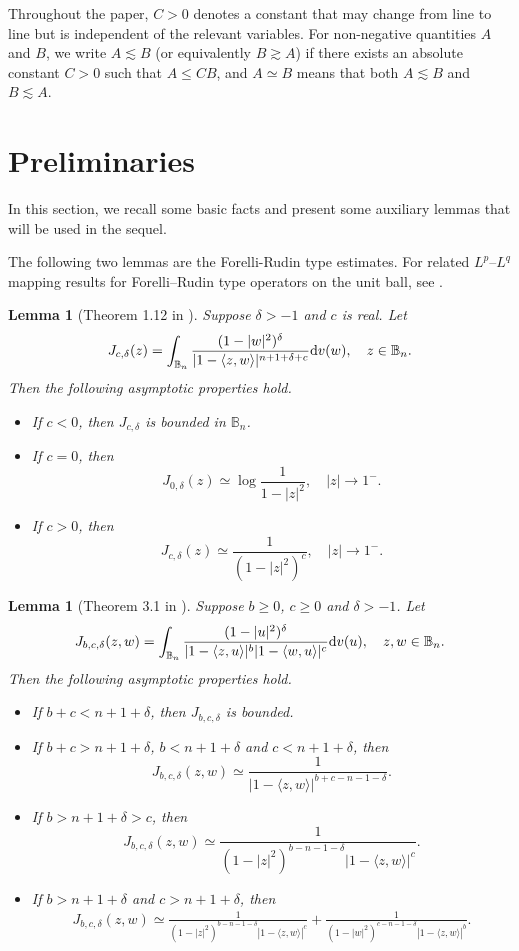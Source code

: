 \documentclass[preprint,12pt,times]{elsarticle}
\newtheorem{lemma}[theorem]{Lemma}
\theoremstyle{definition}
\theoremstyle{remark}
\numberwithin{equation}{section}
\begin{document}
Throughout the paper, $C>0$ denotes a constant that may change from line
to line but is independent of the relevant variables. For non-negative quantities $A$ and $B$, we write $A\lesssim B$ (or equivalently $B\gtrsim A$) if there exists an absolute constant $C>0$ such that $A\leq CB$, and $A\simeq B$ means that both $A\lesssim B$ and $B\lesssim A$. 

\section{Preliminaries}

In this section, we recall some basic facts and present some auxiliary lemmas that will be used in the sequel.

The following two lemmas are the Forelli-Rudin type estimates. For related
$L^p$--$L^q$ mapping results for Forelli--Rudin type operators on the unit
ball, see \cite{ZhaoZhou2022}.

\begin{lemma}[Theorem 1.12 in \cite{Zhu2005}]\label{lemma2.1}
Suppose $\delta>-1$ and $c$ is real. Let
\[
    J_{c,\delta}(z)=\int_{\mathbb{B}_n}\frac{(1-|w|^2)^{\delta}}{|1-\langle z,w\rangle|^{n+1+\delta+c}}{\rm d}v(w),\quad z\in\mathbb{B}_n.
\]
Then the following asymptotic properties hold.
\begin{itemize}
\item[(1)] If $c<0$, then $J_{c,\delta}$ is bounded in $\mathbb{B}_n$.
\item[(2)] If $c=0$, then
\[
    J_{0,\delta}(z)\simeq \log\frac{1}{1-|z|^2},\quad |z|\to 1^-.
\]
\item[(3)] If $c>0$, then
\[
    J_{c,\delta}(z)\simeq \frac{1}{(1-|z|^2)^c},\quad |z|\to 1^{-}.
\]
\end{itemize}
\end{lemma}

\begin{lemma}[Theorem 3.1 in \cite{ZhangLiShangGuo2018}]\label{lemma2.2}
Suppose $b\geq 0$, $c\geq 0$ and $\delta>-1$. Let 
\[
    J_{b,c,\delta}(z,w)=\int_{\mathbb{B}_n}\frac{(1-|u|^2)^{\delta}}{|1-\langle z,u\rangle|^{b}|1-\langle w,u\rangle|^c}{\rm d}v(u),\quad z,w\in\mathbb{B}_n.
\]
Then the following asymptotic properties hold.
\begin{itemize}
\item[(1)] If $b+c<n+1+\delta$, then $J_{b,c,\delta}$ is bounded.
\item[(2)] If $b+c>n+1+\delta$, $b<n+1+\delta$ and $c<n+1+\delta$, then 
\[
    J_{b,c,\delta}(z,w)\simeq \frac{1}{|1-\langle z,w\rangle|^{b+c-n-1-\delta}}.
\]
\item[(3)] If $b>n+1+\delta>c$, then 
\[
    J_{b,c,\delta}(z,w)\simeq \frac{1}{(1-|z|^2)^{b-n-1-\delta}|1-\langle z,w\rangle|^c}.
\]
\item[(4)] If $b>n+1+\delta$ and $c>n+1+\delta$, then
\begin{align*}
J_{b,c,\delta}(z,w)\simeq \frac{1}{(1-|z|^2)^{b-n-1-\delta}|1-\langle z,w\rangle|^c}+\frac{1}{(1-|w|^2)^{c-n-1-\delta}|1-\langle z,w\rangle|^{b}}.
\end{align*}
\end{itemize}
\end{lemma}
\end{document}
